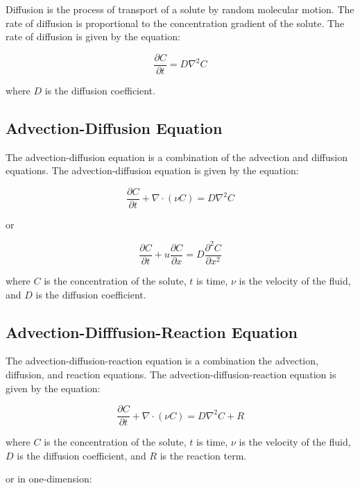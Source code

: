 \documentclass{tufte-handout}\usepackage[]{graphicx}\usepackage[]{xcolor}
\begin{document}
Diffusion is the process of transport of a solute by random molecular motion. The rate of diffusion is proportional to the concentration gradient of the solute. The rate of diffusion is given by the equation:

\begin{equation}
\frac{\partial C}{\partial t} = D \nabla^2 C
\end{equation}

where $D$ is the diffusion coefficient.

\subsection{Advection-Diffusion Equation}

The advection-diffusion equation is a combination of the advection and diffusion equations. The advection-diffusion equation is given by the equation:

\begin{equation}
\frac{\partial C}{\partial t} + \nabla \cdot (\nu C) = D \nabla^2 C
\end{equation}

or 

\begin{equation}
\frac{\partial C}{\partial t} + u \frac{\partial C}{\partial x} = D \frac{\partial^2 C}{\partial x^2}
\end{equation}

where $C$ is the concentration of the solute, $t$ is time, $\nu$ is the velocity of the fluid, and $D$ is the diffusion coefficient.

\subsection{Advection-Difffusion-Reaction Equation}

The advection-diffusion-reaction equation is a combination the advection, diffusion, and reaction equations. The advection-diffusion-reaction equation is given by the equation:

\begin{equation}
\frac{\partial C}{\partial t} + \nabla \cdot (\nu C) = D \nabla^2 C + R
\end{equation}

where $C$ is the concentration of the solute, $t$ is time, $\nu$ is the velocity of the fluid, $D$ is the diffusion coefficient, and $R$ is the reaction term.

or in one-dimension:
\end{document}
